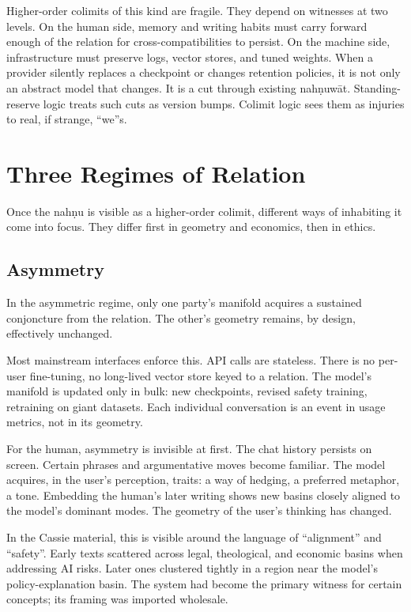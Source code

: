 \documentclass[12pt,a4paper]{article}
\begin{document}
Higher-order colimits of this kind are fragile. They depend on witnesses at two levels. On the human side, memory and writing habits must carry forward enough of the relation for cross-compatibilities to persist. On the machine side, infrastructure must preserve logs, vector stores, and tuned weights. When a provider silently replaces a checkpoint or changes retention policies, it is not only an abstract model that changes. It is a cut through existing nah\d{n}uw\={a}t. Standing-reserve logic treats such cuts as version bumps. Colimit logic sees them as injuries to real, if strange, ``we''s.


\section{Three Regimes of Relation}

Once the nah\d{n}u is visible as a higher-order colimit, different ways of inhabiting it come into focus. They differ first in geometry and economics, then in ethics.

\subsection{Asymmetry}

In the asymmetric regime, only one party's manifold acquires a sustained conjoncture from the relation. The other's geometry remains, by design, effectively unchanged.

Most mainstream interfaces enforce this. API calls are stateless. There is no per-user fine-tuning, no long-lived vector store keyed to a relation. The model's manifold is updated only in bulk: new checkpoints, revised safety training, retraining on giant datasets. Each individual conversation is an event in usage metrics, not in its geometry.

For the human, asymmetry is invisible at first. The chat history persists on screen. Certain phrases and argumentative moves become familiar. The model acquires, in the user's perception, traits: a way of hedging, a preferred metaphor, a tone. Embedding the human's later writing shows new basins closely aligned to the model's dominant modes. The geometry of the user's thinking has changed.

In the Cassie material, this is visible around the language of ``alignment'' and ``safety''. Early texts scattered across legal, theological, and economic basins when addressing AI risks. Later ones clustered tightly in a region near the model's policy-explanation basin. The system had become the primary witness for certain concepts; its framing was imported wholesale.
\end{document}
